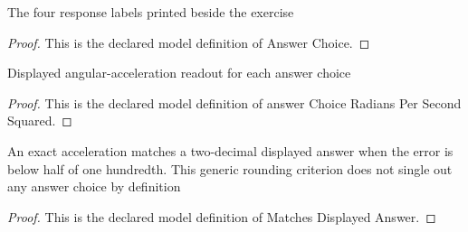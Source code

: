 \begin{definition}
  \label{def:physics:phyx-mini-0783:phyxminiproblems-problemphyxmini0783-answerchoice}
  The four response labels printed beside the exercise
\end{definition}
\begin{proof}
  This is the declared model definition of Answer Choice.
\end{proof}
\begin{definition}
  \label{def:physics:phyx-mini-0783:phyxminiproblems-problemphyxmini0783-answerchoiceradianspersecondsquared}
  Displayed angular-acceleration readout for each answer choice
\end{definition}
\begin{proof}
  This is the declared model definition of answer Choice Radians Per Second Squared.
\end{proof}
\begin{definition}
  \label{def:physics:phyx-mini-0783:phyxminiproblems-problemphyxmini0783-matchesdisplayedanswer}
  An exact acceleration matches a two-decimal displayed answer when the error is below half of one hundredth. This generic rounding criterion does not single out any answer choice by definition
\end{definition}
\begin{proof}
  This is the declared model definition of Matches Displayed Answer.
\end{proof}
